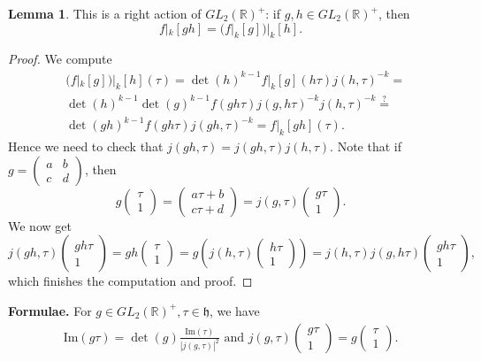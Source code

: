 \documentclass{article}
\theoremstyle{definition}
\newtheorem{lemma}[theorem]{Lemma}
\begin{document}
\begin{lemma}
    This is a right action of $GL_2(\mathbb{R})^+$: if $g,h \in GL_2(\mathbb{R})^+$, then $$f|_k[gh] = (f|_k[g])|_k[h].$$
\end{lemma}
\begin{proof}
    We compute
    \begin{align*}
        &(f|_k[g])|_k[h](\tau) = \det(h)^{k-1}f|_k[g](h \tau) j(h, \tau)^{-k} = \\
        &\det(h)^{k-1}\det(g)^{k-1}f(g h \tau) j(g, h \tau)^{-k} j(h, \tau)^{-k}  \stackrel{?}{=}\\
        & \det(gh)^{k-1} f(gh \tau) j(gh, \tau)^{-k} = f|_k[gh](\tau). 
    \end{align*}
    Hence we need to check that $j(gh, \tau) = j(gh, \tau)j(h, \tau)$. Note that if $g = \begin{pmatrix} a & b \\ c & d \end{pmatrix}$, then \[
    g \begin{pmatrix} \tau \\ 1 \end{pmatrix} = \begin{pmatrix} a \tau + b\\ c \tau + d \end{pmatrix} = j(g,\tau)\begin{pmatrix} g \tau \\ 1 \end{pmatrix}.
    \]
    We now get\[
    j(gh, \tau) \begin{pmatrix} g h \tau \\ 1 \end{pmatrix} = gh \begin{pmatrix} \tau \\ 1 \end{pmatrix} = g \left( j(h, \tau) \begin{pmatrix} h \tau \\ 1 \end{pmatrix}\right) = j(h, \tau) j(g, h \tau) \begin{pmatrix} g h \tau \\ 1 \end{pmatrix},
    \]
    which finishes the computation and proof.
\end{proof}
\textbf{Formulae.} For $g \in GL_2(\mathbb{R})^+, \tau \in \mathfrak{h}$, we have \begin{align*}
    \text{Im}(g \tau) = \det(g) \frac{\text{Im}(\tau)}{|j(g,\tau)|^2} \text{ and } j(g,\tau) \begin{pmatrix} g \tau \\ 1 \end{pmatrix} = g \begin{pmatrix} \tau \\ 1 \end{pmatrix}.
\end{align*} 
\end{document}
